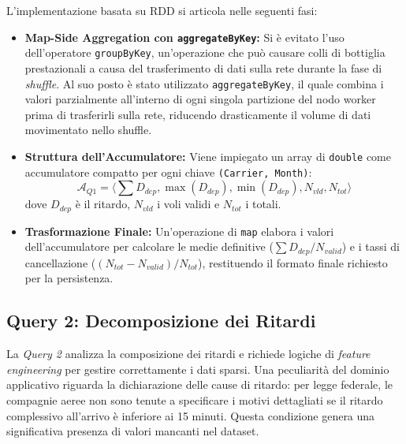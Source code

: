 \documentclass[conference]{IEEEtran}
\begin{document}
L'implementazione basata su RDD si articola nelle seguenti fasi:
\begin{itemize}
    \item \textbf{Map-Side Aggregation con \texttt{aggregateByKey}:} Si è evitato l'uso dell'operatore \texttt{groupByKey}, un'operazione che può causare colli di bottiglia prestazionali a causa del trasferimento di dati sulla rete durante la fase di \textit{shuffle}. Al suo posto è stato utilizzato \texttt{aggregateByKey}, il quale combina i valori parzialmente all'interno di ogni singola partizione del nodo worker prima di trasferirli sulla rete, riducendo drasticamente il volume di dati movimentato nello shuffle.
    \item \textbf{Struttura dell'Accumulatore:} Viene impiegato un array di \texttt{double} come accumulatore compatto per ogni chiave \texttt{(Carrier, Month)}:
    \[
    \mathcal{A}_{Q1} = \langle \textstyle \sum D_{dep}, \max(D_{dep}), \min(D_{dep}), N_{vld}, N_{tot} \rangle
    \]
    dove $D_{dep}$ è il ritardo, $N_{vld}$ i voli validi e $N_{tot}$ i totali.
    \item \textbf{Trasformazione Finale:} Un'operazione di \texttt{map} elabora i valori dell'accumulatore per calcolare le medie definitive ($ \sum D_{dep} / N_{valid} $) e i tassi di cancellazione ($ (N_{tot} - N_{valid}) / N_{tot} $), restituendo il formato finale richiesto per la persistenza.
\end{itemize}

\subsection{Query 2: Decomposizione dei Ritardi}\label{subsec:query2_details}
La \textit{Query 2} analizza la composizione dei ritardi e richiede logiche di \textit{feature engineering} per gestire correttamente i dati sparsi.
Una peculiarità del dominio applicativo riguarda la dichiarazione delle cause di ritardo: per legge federale, le compagnie aeree non sono tenute a specificare i motivi dettagliati se il ritardo complessivo all'arrivo è inferiore ai 15 minuti.
Questa condizione genera una significativa presenza di valori mancanti nel dataset.
\end{document}
